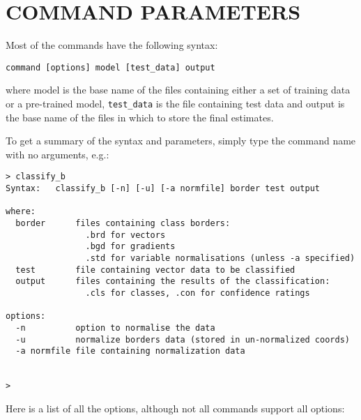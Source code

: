 \documentclass[12pt]{article}
\begin{document}
\section{COMMAND PARAMETERS}

Most of the commands have the following syntax:

\begin{verbatim}
command [options] model [test_data] output
\end{verbatim}

where model is the base name of the files containing either a set of training data or a pre-trained model, \verb/test_data/ is the file containing test data and output is the base name of the files in which to store the final estimates.  

To get a summary of the syntax and parameters, simply type the command name with no arguments, e.g.:

\begin{verbatim}
> classify_b
Syntax:   classify_b [-n] [-u] [-a normfile] border test output

where:
  border      files containing class borders:
                .brd for vectors
                .bgd for gradients
                .std for variable normalisations (unless -a specified)
  test        file containing vector data to be classified
  output      files containing the results of the classification:
                .cls for classes, .con for confidence ratings

options:
  -n          option to normalise the data
  -u          normalize borders data (stored in un-normalized coords)
  -a normfile file containing normalization data


>
\end{verbatim}

Here is a list of all the options, although not all commands support all options:
\end{document}
